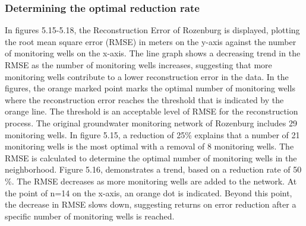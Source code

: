 \newpage

\subsubsection{Determining the optimal reduction rate}
In figures 5.15-5.18, the Reconstruction Error of Rozenburg is displayed, plotting the root mean square error (RMSE) in meters on the y-axis against the number of monitoring wells on the x-axis. The line graph shows a decreasing trend in the RMSE as the number of monitoring wells increases, suggesting that more monitoring wells contribute to a lower reconstruction error in the data. In the figures, the orange marked point marks the optimal number of monitoring wells where the reconstruction error reaches the threshold that is indicated by the orange line. The threshold is an acceptable level of RMSE for the reconstruction process. The original groundwater monitoring network of Rozenburg includes 29 monitoring wells.
\newline
In figure 5.15, a reduction of 25\% explains that a number of 21 monitoring wells is the most optimal with a removal of 8 monitoring wells. The RMSE is calculated to determine the optimal number of monitoring wells in the neighborhood. Figure 5.16, demonstrates a trend, based on a reduction rate of 50 \%. The RMSE decreases as more monitoring wells are added to the network. At the point of n=14 on the x-axis, an orange dot is indicated. Beyond this point, the decrease in RMSE slows down, suggesting returns on error reduction after a specific number of monitoring wells is reached. 

